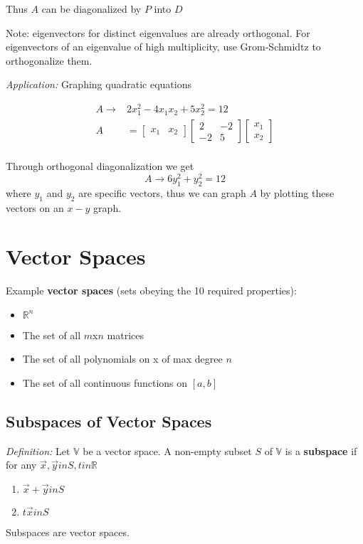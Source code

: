 \documentclass[12pt]{article}
\newcommand{\R}[1]{\mathbb{R}^{#1}}
\newcommand{\vectwo}[2]{\begin{bmatrix}#1\\#2\end{bmatrix}}
\begin{document}
Thus $A$ can be diagonalized by $P$ into $D$

Note: eigenvectors for distinct eigenvalues are already orthogonal. For eigenvectors of an eigenvalue of high multiplicity, use Grom-Schmidtz to orthogonalize them.

\textit{Application:} Graphing quadratic equations

\begin{align*}
A \to& 2x_1^2 - 4x_1x_2 + 5x_2^2 = 12\\
A &= \begin{bmatrix}x_1&x_2\end{bmatrix}\begin{bmatrix}2&-2\\-2&5\end{bmatrix}\vectwo{x_1}{x_2}\\
\end{align*}

Through orthogonal diagonalization we get \[ A \to 6y_1^2 + y_2^2 = 12 \] where $y_1$ and $y_2$ are specific vectors, thus we can graph $A$ by plotting these vectors on an $x-y$ graph.

\section*{Vector Spaces}
Example {\bf vector spaces} (sets obeying the 10 required properties):
\begin{itemize}
\item $\R{n}$
\item The set of all $m$x$n$ matrices
\item The set of all polynomials on x of max degree $n$
\item The set of all continuous functions on $[a,b]$
\end{itemize}

\subsection*{Subspaces of Vector Spaces}
\textit{Definition:} Let $\mathbb{V}$ be a vector space. A non-empty subset $S$ of $\mathbb{V}$ is a {\bf subspace} if for any $\vec{x}, \vec{y} in S, t in \mathbb{R}$
\begin{enumerate}
\item $\vec{x} + \vec{y} in S$
\item $t\vec{x} in S$
\end{enumerate}

Subspaces are vector spaces.
\end{document}

